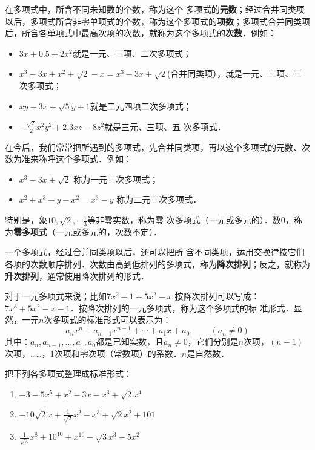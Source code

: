 在多项式中，所含不同未知数的个数，称为这个
多项式的\textbf{元数}；经过合并同类项以后，多项式所含非零单项式的个数，称为这个多项式的\textbf{项数}；多项式合并同类项后，所含各单项式中最高次项的次数，就称为这个多项式的\textbf{次数}．例如：
\begin{itemize}
    \item $3x+0.5+2x^2$就是一元、三项、二次多项式；
    \item $x^3-3x+x^2+\sqrt{2}-x=x^3-3x+\sqrt{2}$(合并同类项），就是一元、三项、三次多项式；
    \item $xy-3x+\sqrt{5}y+1$就是二元四项二次多项式；
    \item $-\frac{\sqrt{2}}{2}x^2y^2 +2.3xz-8z^2$就是三元、三项、五
次多项式．
\end{itemize}

在今后，我们常常把所遇到的多项式，先合并同类项，再以这个多项式的元数、次数为准来称呼这个多项式．例如：
\begin{itemize}
    \item $x^3-3x+\sqrt{2}$ 称为一元三次多项式；
    \item $x^2+x^3-y-x^2=x^3-y$ 称为二元三次多项式．
\end{itemize}
特别是，象$10,\sqrt{2},-\frac{1}{3}$等非零实数，称为零
次多项式（一元或多元的）．数0，称为\textbf{零多项式}（一元或多元的，次数不定）．

一个多项式，经过合并同类项以后，还可以把所
含不同类项，运用交换律按它们各项的次数顺序排列．次数由高到低排列的多项式，称为\textbf{降次排列}；反之，就称为\textbf{升次排列}，通常使用降次排列的形式．

对于一元多项式来说；比如$7x^2-1+5x^2-x$ 按降次排列可以写成：
$7x^3+5x^2-x-1$．按降次排列的一元多项式，称为这个多项式的标
准形式．显然，一元$n$次多项式的标准形式可以表示为：
\[a_nx^n+a_{n-1}x^{n-1}+\cdots +a_1x+a_0,\qquad (a_n\ne 0) \]
其中：$a_n,a_{n-1},\ldots,a_1,a_0$都是已知实数，且$a_n\ne 0$，它们分别是$n$次项，$(n-1)$次项，……，1次项和零次项（常数项）的系数．$n$是自然数．

\begin{example}
    把下列各多项式整理成标准形式：
    \begin{enumerate}
        \item $-3-5x^5+x^2-3x-x^3+\sqrt{2}x^4$
        \item $-10\sqrt{2}x+\frac{1}{\sqrt{2}}x^2-x^3+\sqrt{2}x^2+101$
        \item $\frac{1}{\sqrt{3}}x^8+10^{10}+x^{10}-\sqrt{3}x^3-5x^2$
    \end{enumerate}
\end{example}

